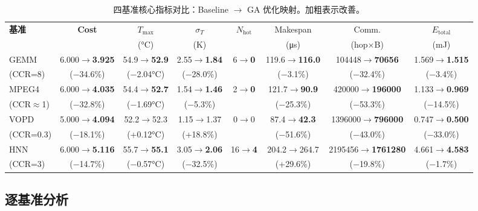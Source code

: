\documentclass[conference]{IEEEtran}
\begin{document}
\begin{table}[t]
\centering
\caption{四基准核心指标对比：Baseline $\rightarrow$ GA 优化映射。加粗表示改善。}
\label{tab:all}
\begin{tabular}{lccccccc}
\toprule
\textbf{基准} & \textbf{Cost} & $T_{\max}$ & $\sigma_T$ & $N_{\text{hot}}$ & Makespan & Comm. & $E_{\text{total}}$ \\
 & & (\si{\degreeCelsius}) & (K) & & (\si{\micro\second}) & (hop$\times$B) & (\si{\milli\joule}) \\
\midrule
GEMM   & 6.000$\rightarrow$\textbf{3.925} & 54.9$\rightarrow$\textbf{52.9} & 2.55$\rightarrow$\textbf{1.84} & 6$\rightarrow$\textbf{0} & 119.6$\rightarrow$\textbf{116.0} & 104448$\rightarrow$\textbf{70656} & 1.569$\rightarrow$\textbf{1.515} \\
(CCR=8) & ($-$34.6\%) & ($-$2.04\si{\degreeCelsius}) & ($-$28.0\%) & & ($-$3.1\%) & ($-$32.4\%) & ($-$3.4\%) \\
\midrule
MPEG4  & 6.000$\rightarrow$\textbf{4.035} & 54.4$\rightarrow$\textbf{52.7} & 1.54$\rightarrow$\textbf{1.46} & 2$\rightarrow$\textbf{0} & 121.7$\rightarrow$\textbf{90.9} & 420000$\rightarrow$\textbf{196000} & 1.133$\rightarrow$\textbf{0.969} \\
(CCR$\approx$1) & ($-$32.8\%) & ($-$1.69\si{\degreeCelsius}) & ($-$5.3\%) & & ($-$25.3\%) & ($-$53.3\%) & ($-$14.5\%) \\
\midrule
VOPD   & 5.000$\rightarrow$\textbf{4.094} & 52.2$\rightarrow$52.3 & 1.15$\rightarrow$1.37 & 0$\rightarrow$0 & 87.4$\rightarrow$\textbf{42.3} & 1396000$\rightarrow$\textbf{796000} & 0.747$\rightarrow$\textbf{0.500} \\
(CCR=0.3) & ($-$18.1\%) & (+0.12\si{\degreeCelsius}) & (+18.8\%) & & ($-$51.6\%) & ($-$43.0\%) & ($-$33.0\%) \\
\midrule
HNN    & 6.000$\rightarrow$\textbf{5.116} & 55.7$\rightarrow$\textbf{55.1} & 3.05$\rightarrow$\textbf{2.06} & 16$\rightarrow$\textbf{4} & 204.2$\rightarrow$264.7 & 2195456$\rightarrow$\textbf{1761280} & 4.661$\rightarrow$\textbf{4.583} \\
(CCR=3) & ($-$14.7\%) & ($-$0.57\si{\degreeCelsius}) & ($-$32.5\%) & & (+29.6\%) & ($-$19.8\%) & ($-$1.7\%) \\
\midrule
\bottomrule
\end{tabular}
\end{table}

\subsection{逐基准分析}
\end{document}
